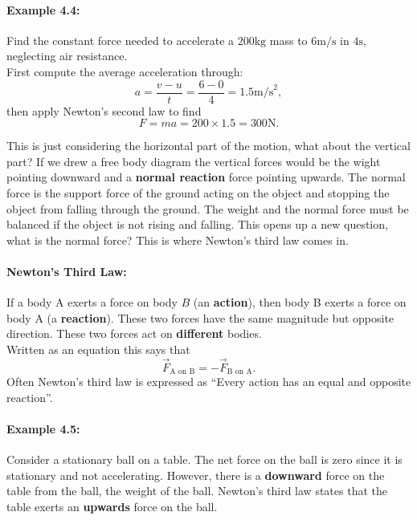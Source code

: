 \paragraph{Example 4.4:} Find the constant force needed to accelerate a $200\text{kg}$ mass to $6\text{m/s}$ in $4\text{s}$, neglecting air resistance.\\

First compute the average acceleration through:
\begin{equation*}
a=\frac{v-u}{t}=\frac{6-0}{4}=1.5\text{m/s}^{2},
\end{equation*}
then apply Newton's second law to find
\begin{equation*}
F=ma=200\times 1.5 =300\text{N}.
\end{equation*}

This is just considering the horizontal part of the motion, what about the vertical part? If we drew a free body diagram the vertical forces would be the wight pointing downward and a \textbf{normal reaction} force pointing upwards. The normal force is the support force of the ground acting on the object and stopping the object from falling through the ground. The weight and the normal force must be balanced if the object is not rising and falling. This opens up a new question, what is the normal force? This is where Newton's third law comes in.

\paragraph{Newton's Third Law:} If a body A exerts a force on body $B$ (an \textbf{action}), then body B exerts a force on body A (a \textbf{reaction}). These two forces have the same magnitude but opposite direction. These two forces act on \textbf{different} bodies.\\

Written as an equation this says that
\begin{equation*}
\vec{F}_{\text{A on B}}=-\vec{F}_{\text{B on A}}.
\end{equation*}
Often Newton's third law is expressed as ``Every action has an equal and opposite reaction''.

\paragraph{Example 4.5:} Consider a stationary ball on a table. The net force on the ball is zero since it is stationary and not accelerating. However, there is a \textbf{downward} force on the table from the ball, the weight of the ball. Newton's third law states that the table exerts an \textbf{upwards} force on the ball.\\

